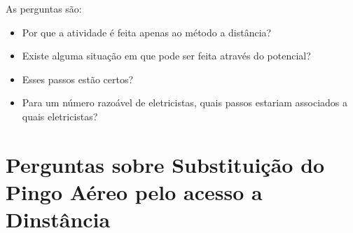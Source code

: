 As perguntas são: 

\begin{itemize}
\item Por que a atividade é feita apenas ao método a distância? 
\item Existe alguma situação em que pode ser feita através do potencial?
\item Esses passos estão certos? 
\item Para um número razoável de eletricistas, quais passos estariam associados a quais eletricistas? 
\end{itemize}

\section{Perguntas sobre Substituição do Pingo Aéreo pelo acesso a Dinstância} 

